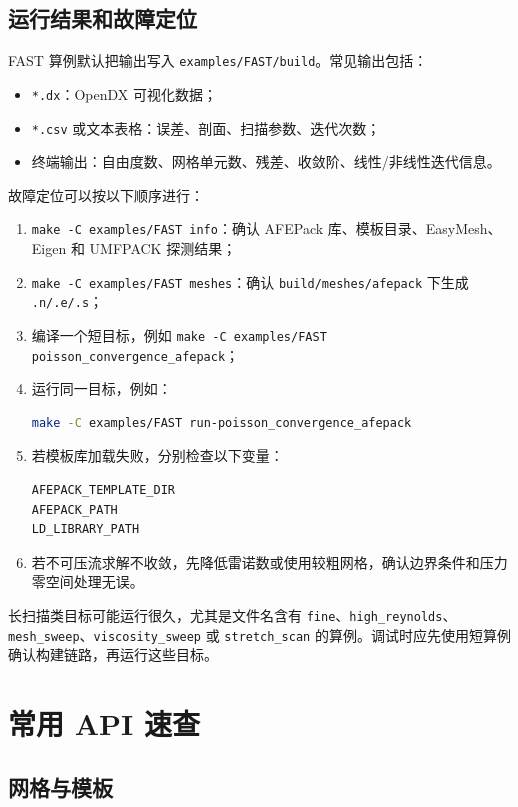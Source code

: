 \documentclass[UTF8,openany,zihao=-4,scheme=chinese]{ctexbook}
\newcommand{\file}[1]{\nolinkurl{#1}}
\newcommand{\cmd}[1]{\texttt{#1}}
\begin{document}
\section{运行结果和故障定位}

FAST 算例默认把输出写入 \file{examples/FAST/build}。常见输出包括：

\begin{itemize}[leftmargin=2em]
  \item \file{*.dx}：OpenDX 可视化数据；
  \item \file{*.csv} 或文本表格：误差、剖面、扫描参数、迭代次数；
  \item 终端输出：自由度数、网格单元数、残差、收敛阶、线性/非线性迭代信息。
\end{itemize}

故障定位可以按以下顺序进行：

\begin{enumerate}[leftmargin=2em]
  \item \cmd{make -C examples/FAST info}：确认 AFEPack 库、模板目录、EasyMesh、Eigen 和 UMFPACK 探测结果；
  \item \cmd{make -C examples/FAST meshes}：确认 \file{build/meshes/afepack} 下生成 \file{.n/.e/.s}；
  \item 编译一个短目标，例如 \cmd{make -C examples/FAST poisson\_convergence\_afepack}；
  \item 运行同一目标，例如：
\begin{lstlisting}[language=bash]
make -C examples/FAST run-poisson_convergence_afepack
\end{lstlisting}
  \item 若模板库加载失败，分别检查以下变量：
\begin{lstlisting}[language=bash]
AFEPACK_TEMPLATE_DIR
AFEPACK_PATH
LD_LIBRARY_PATH
\end{lstlisting}
  \item 若不可压流求解不收敛，先降低雷诺数或使用较粗网格，确认边界条件和压力零空间处理无误。
\end{enumerate}

长扫描类目标可能运行很久，尤其是文件名含有 \file{fine}、\file{high\_reynolds}、\file{mesh\_sweep}、\file{viscosity\_sweep} 或 \file{stretch\_scan} 的算例。调试时应先使用短算例确认构建链路，再运行这些目标。

\chapter{常用 API 速查}

\section{网格与模板}
\end{document}
